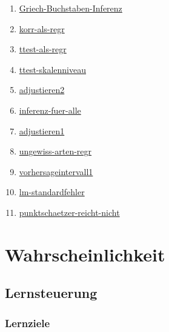 \documentclass[
  a4paper,
  DIV=11]{scrreprt}
\providecommand{\tightlist}{%
  \setlength{\itemsep}{0pt}\setlength{\parskip}{0pt}}\usepackage{longtable,booktabs,array}
\theoremstyle{definition}
\theoremstyle{remark}
\begin{document}
\begin{enumerate}
\def\labelenumi{\arabic{enumi}.}
\tightlist
\item
  \href{https://datenwerk.netlify.app/posts/griech-buchstaben-inferenz/griech-buchstaben-inferenz/}{Griech-Buchstaben-Inferenz}
\item
  \href{https://datenwerk.netlify.app/posts/korr-als-regr/korr-als-regr/}{korr-als-regr}
\item
  \href{https://datenwerk.netlify.app/posts/ttest-als-regr/ttest-als-regr/}{ttest-als-regr}
\item
  \href{https://datenwerk.netlify.app/posts/ttest-skalenniveau/ttest-skalenniveau/}{ttest-skalenniveau}
\item
  \href{https://datenwerk.netlify.app/posts/adjustieren2/adjustieren2/}{adjustieren2}
\item
  \href{https://datenwerk.netlify.app/posts/inferenz-fuer-alle/inferenz-fuer-alle}{inferenz-fuer-alle}
\item
  \href{https://datenwerk.netlify.app/posts/adjustieren1/adjustieren1.html}{adjustieren1}
\item
  \href{https://datenwerk.netlify.app/posts/ungewiss-arten-regr/ungewiss-arten-regr.html}{ungewiss-arten-regr}
\item
  \href{https://datenwerk.netlify.app/posts/vorhersageintervall1/vorhersageintervall1.html}{vorhersageintervall1}
\item
  \href{https://datenwerk.netlify.app/posts/lm-standardfehler/lm-standardfehler}{lm-standardfehler}
\item
  \href{https://datenwerk.netlify.app/posts/punktschaetzer-reicht-nicht/punktschaetzer-reicht-nicht.html}{punktschaetzer-reicht-nicht}
\end{enumerate}


\hypertarget{wahrscheinlichkeit}{%
\chapter{Wahrscheinlichkeit}\label{wahrscheinlichkeit}}

\hypertarget{lernsteuerung-1}{%
\section{Lernsteuerung}\label{lernsteuerung-1}}

\hypertarget{lernziele-2}{%
\subsection{Lernziele}\label{lernziele-2}}
\end{document}

